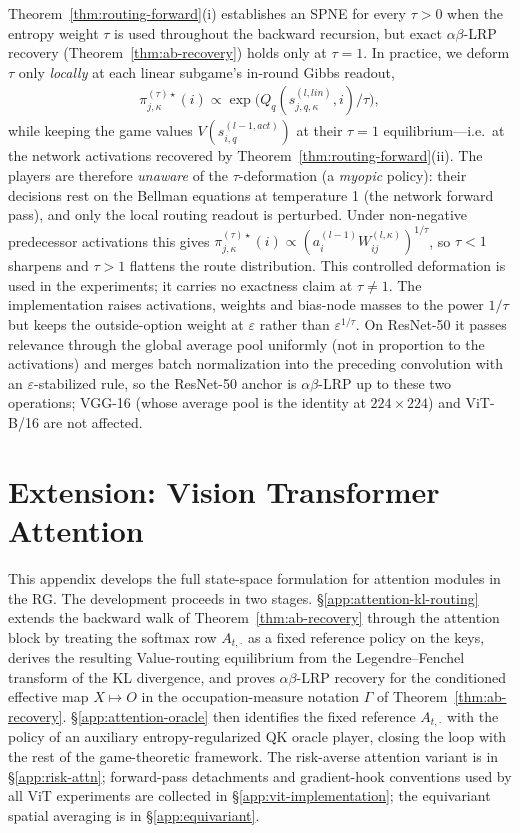 \documentclass[twoside]{article}
\newcommand{\1}{\mathbf{1}}
\begin{document}
Theorem~\ref{thm:routing-forward}(i) establishes an SPNE for every $\tau > 0$ when the entropy
weight $\tau$ is used throughout the backward recursion, but exact $\alpha\beta$-\ac{LRP} recovery
(Theorem~\ref{thm:ab-recovery}) holds only at $\tau=1$. In practice, we deform $\tau$ only
\emph{locally} at each linear subgame's in-round Gibbs readout,
\begin{align}\label{eq:routing-gibbs-general-tau}
    \pi_{j,\kappa}^{(\tau)\star}(i) \propto \exp\!\bigl(Q_q(s_{j,q,\kappa}^{(l, lin)}, i)/\tau\bigr),
\end{align}
while keeping the game values $V(s_{i,q}^{(l-1, act)})$ at their $\tau{=}1$ equilibrium---i.e.\ at
the network activations recovered by Theorem~\ref{thm:routing-forward}(ii). The players are
therefore \emph{unaware} of the $\tau$-deformation (a \emph{myopic} policy): their decisions rest
on the Bellman equations at temperature 1 (the network forward pass), and only the local routing
readout is perturbed. Under non-negative predecessor activations this gives
$\pi_{j,\kappa}^{(\tau)\star}(i) \propto (a_i^{(l-1)} W_{ij}^{(l,\kappa)})^{1/\tau}$, so $\tau<1$
sharpens and $\tau>1$ flattens the route distribution. This controlled deformation is used in the
experiments; it carries no exactness claim at $\tau \neq 1$. The implementation raises activations,
weights and bias-node masses to the power $1/\tau$ but keeps the outside-option weight at
$\varepsilon$ rather than $\varepsilon^{1/\tau}$. On ResNet-50 it passes relevance through the
global average pool uniformly (not in proportion to the activations) and merges batch normalization
into the preceding convolution with an $\varepsilon$-stabilized rule, so the ResNet-50 anchor is
$\alpha\beta$-\ac{LRP} up to these two operations; VGG-16 (whose average pool is the identity at
$224{\times}224$) and ViT-B/16 are not affected.
\newpage
\section{Extension: Vision Transformer Attention}\label{app:vit-extension}\label{app:attention-subgame}

This appendix develops the full state-space formulation for attention modules in the \ac{RG}. The
development proceeds in two stages. \S\ref{app:attention-kl-routing} extends the backward walk of
Theorem~\ref{thm:ab-recovery} through the attention block by treating the softmax row $A_{t,\cdot}$
as a fixed reference policy on the keys, derives the resulting Value-routing equilibrium from the
Legendre--Fenchel transform of the KL divergence, and proves $\alpha\beta$-\ac{LRP} recovery for
the conditioned effective map $X \mapsto O$ in the occupation-measure notation $\Gamma$ of
Theorem~\ref{thm:ab-recovery}. \S\ref{app:attention-oracle} then identifies the fixed reference
$A_{t,\cdot}$ with the policy of an auxiliary entropy-regularized QK oracle player, closing the
loop with the rest of the game-theoretic framework. The risk-averse attention variant is in
\S\ref{app:risk-attn}; forward-pass detachments and gradient-hook conventions used by all ViT
experiments are collected in \S\ref{app:vit-implementation}; the equivariant spatial averaging is
in \S\ref{app:equivariant}.
\end{document}
